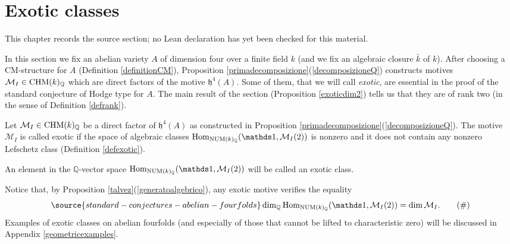 \chapter{Exotic classes}
\label{standard-conjectures-abelian-fourfolds-chapter-07}

\begin{remark}
\label{standard-conjectures-abelian-fourfolds-chapter-07-source}
This chapter records the source section; no Lean declaration has yet been checked for this material.
\notready
\end{remark}

\label{sectionexotic}
In this section we fix an abelian variety $A$  of dimension four over a finite field $k$ (and we fix an algebraic closure $\bar{k}$ of $k$). After choosing a CM-structure for $A$ (Definition \ref{definitionCM}), Proposition \ref{primadecomposizione}(\ref{decomposizioneQ}) constructs motives ${\mathcal{M}_I \in \mathrm{CHM} (k)_{\mathbb{Q}}}$ which are direct factors of the motive  $\mathfrak{h}^{4}(A)$. Some of them, that we will call \textit{exotic}, are essential in the proof of the standard conjecture of Hodge type for $A$. The main result of the section (Proposition \ref{exoticdim2}) tells us that they are of rank two (in the sense of Definition \ref{defrank}).
\begin{definition}
\notready\label{definizione}
Let  $\mathcal{M}_I \in \mathrm{CHM} (k)_{\mathbb{Q}}$ be a  direct factor of $\mathfrak{h}^{4}(A)$ as constructed in Proposition \ref{primadecomposizione}(\ref{decomposizioneQ}). The motive $\mathcal{M}_I $  is called exotic if the  space of algebraic classes $\Hom_{\NUM(k)_\Q}(\one, \mathcal{M}_I (2))$ is nonzero and it does not contain any  nonzero Lefschetz class (Definition \ref{defexotic}).

An element in the $\mathbb{Q}$-vector space $\Hom_{\NUM(k)_\Q}(\one, \mathcal{M}_I (2))$ will be called an exotic class.
\end{definition}
\begin{remark}
\notready\label{remarkuguale}
Notice that, by Proposition \ref{talvez}(\ref{generatoalgebrico}), any exotic motive verifies the equality
\begin{equation} \label{eq:uguale}
\source{standard-conjectures-abelian-fourfolds}
\dim_\Q \Hom_{\NUM(k)_\Q}(\one, \mathcal{M}_I (2)) = \dim \mathcal{M}_I.
 \tag{$\#$}
\end{equation}
Examples of exotic classes on abelian fourfolds (and especially of those that cannot be lifted to characteristic zero) will be discussed in  Appendix \ref{geometricexamples}.
\end{remark}
